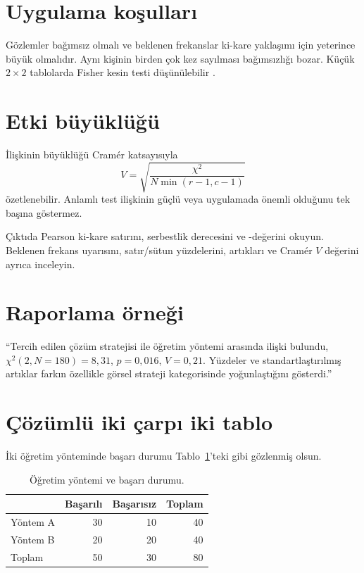 \section{Uygulama koşulları}
\label{sec:chi-assumptions}

Gözlemler bağımsız olmalı ve beklenen frekanslar ki-kare yaklaşımı için
yeterince büyük olmalıdır. Aynı kişinin birden çok kez sayılması bağımsızlığı
bozar. Küçük $2\times2$ tablolarda Fisher kesin testi düşünülebilir
\citep{agresti2018}.

\section{Etki büyüklüğü}
\label{sec:cramers-v}

İlişkinin büyüklüğü Cramér katsayısıyla
\[
V=\sqrt{\frac{\chi^2}{N\min(r-1,c-1)}}
\]
özetlenebilir. Anlamlı test ilişkinin güçlü veya uygulamada önemli olduğunu
tek başına göstermez.

\begin{outputguidebox}
Çıktıda Pearson ki-kare satırını, serbestlik derecesini ve \pval-değerini
okuyun. Beklenen frekans uyarısını, satır/sütun yüzdelerini, artıkları ve
Cramér $V$ değerini ayrıca inceleyin.
\end{outputguidebox}

\section{Raporlama örneği}

``Tercih edilen çözüm stratejisi ile öğretim yöntemi arasında ilişki bulundu,
$\chi^2(2,N=180)=8{,}31$, $p=0{,}016$, $V=0{,}21$. Yüzdeler ve
standartlaştırılmış artıklar farkın özellikle görsel strateji kategorisinde
yoğunlaştığını gösterdi.''

\section{Çözümlü iki çarpı iki tablo}

İki öğretim yönteminde başarı durumu Tablo~\ref{tab:teaching-success}'teki
gibi gözlenmiş olsun.

\begin{table}[H]
\centering
\caption{Öğretim yöntemi ve başarı durumu.}
\label{tab:teaching-success}
\begin{tabular}{lrrr}
\toprule
 & Başarılı & Başarısız & Toplam \\
\midrule
Yöntem A & 30 & 10 & 40 \\
Yöntem B & 20 & 20 & 40 \\
\midrule
Toplam & 50 & 30 & 80 \\
\bottomrule
\end{tabular}
\end{table}

